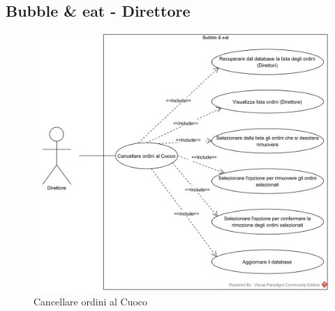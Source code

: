 \subsection{Bubble \& eat - Direttore}


\begin{figure}[H]
	\centering
	\includegraphics[width=15cm]{../../documenti/AnalisiDeiRequisiti/Diagrammi_img/uc3_12.png}
	\caption{\UCCaption{} Cancellare ordini al Cuoco}
\end{figure}

